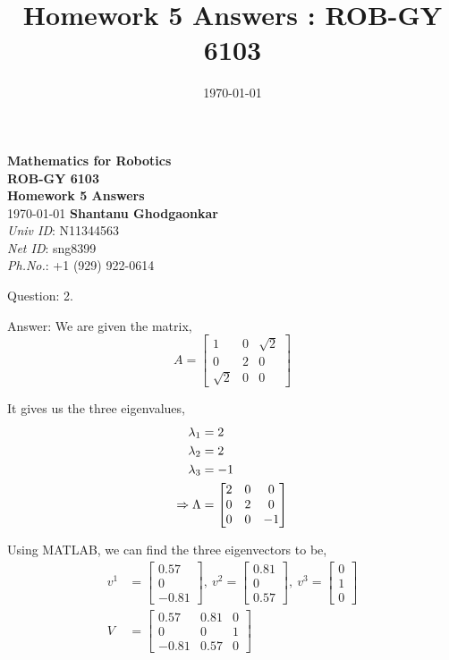 \documentclass[a4paper]{article}
\title{Homework 5 Answers : ROB-GY 6103}
\author{\myName}
\date{\today}
\newcommand{\myName}{\textbf{Shantanu Ghodgaonkar}\\\textit{Univ ID}: N11344563\\\textit{Net ID}: sng8399\\\textit{Ph.No.}: +1 (929) 922-0614}
\begin{document}
	
	\begin{titlepage}
	    \centering
	    \vspace{2cm}
	    \Huge\textbf{Mathematics for Robotics \\ ROB-GY 6103 \\ Homework 5 Answers}
	    \vspace{1cm}
	    \\ \Large \today
	    \vfill
	    \Large \myName
	\end{titlepage}
	
	\begin{qalist}			
		\item[Question: 2.] \setcounter{equation}{0}
		\item[Answer:] We are given the matrix, 
			\begin{equation}
				A = \begin{bmatrix}1 & 0 & \sqrt{2} \\ 0 & 2 & 0 \\ \sqrt{2} & 0 & 0\end{bmatrix}
			\end{equation}
			
			It gives us the three eigenvalues, 
			 \begin{align}
				 {\lambda}_{1} &= 2 \notag \\ {\lambda}_{2} &= 2 \\ {\lambda}_{3} &= -1 \notag \\ \Rightarrow \Lambda &= \begin{bmatrix} 2 & 0 & 0\\ 0 & 2 & 0 \\ 0 & 0 & -1 \end{bmatrix}
			\end{align} 
			
			Using MATLAB, we can find the three eigenvectors to be, 
			\begin{align}
				{v}^{1} &= \begin{bmatrix}  0.57 \\ 0 \\ -0.81 \end{bmatrix} ,~{v}^{2} = \begin{bmatrix}  0.81 \\ 0 \\ 0.57 \end{bmatrix}  ,~{v}^{3} = \begin{bmatrix}  0 \\ 1 \\ 0 \end{bmatrix}\\ 
				V &=  \begin{bmatrix} 0.57 & 0.81 & 0 \\ 0 & 0 & 1 \\ -0.81 & 0.57 & 0 \end{bmatrix}
			\end{align}
			

\end{qalist}
\end{document}
